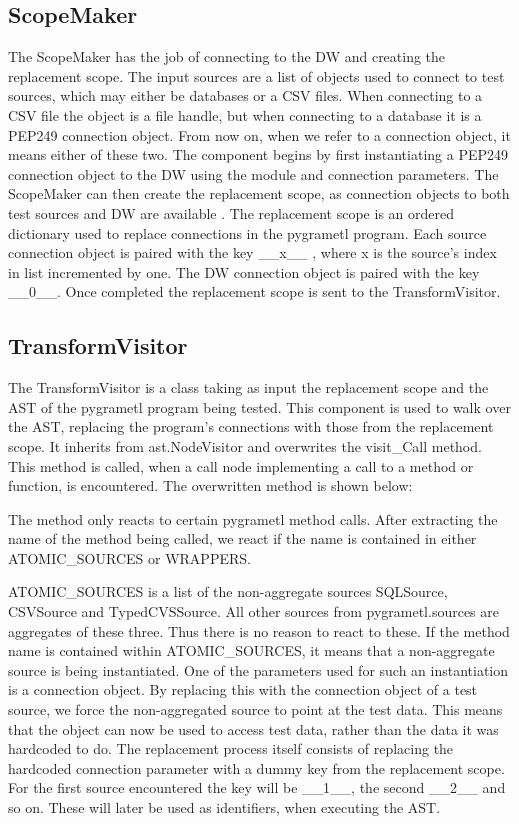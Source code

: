 \subsection{ScopeMaker}
The ScopeMaker has the job of connecting to the DW and creating the replacement scope. The input sources are a list of objects used to connect to test sources, which may either be databases or a CSV files. When connecting to a CSV file the object is a file handle, but when connecting to a database it is a PEP249 connection object. From now on, when we refer to a connection object, it means either of these two. The component begins by first instantiating a PEP249 connection object to the DW using the module and connection parameters. The ScopeMaker can then create the replacement scope, as connection objects to both test sources and DW are available . The replacement scope is an ordered dictionary used to replace connections in the pygrametl program. Each source connection object is paired with the key \_\_x\_\_ , where x is the source's index in list incremented by one. The DW connection object is paired with the key \_\_0\_\_. Once completed the replacement scope is sent to the TransformVisitor.

\subsection{TransformVisitor}
The TransformVisitor is a class taking as input the replacement scope and the AST of the pygrametl program being tested. This component is used to walk over the AST, replacing the program's connections with those from the replacement scope. It inherits from ast.NodeVisitor and overwrites the visit\_Call method. This method is called, when a call node implementing a call to a method or function, is encountered. The overwritten method is shown below:



The method only reacts to certain pygrametl method calls. After extracting the name of the method being called, we react if the name is contained in either ATOMIC\_SOURCES or WRAPPERS.

ATOMIC\_SOURCES is a list of the non-aggregate sources SQLSource, CSVSource and TypedCVSSource. All other sources from pygrametl.sources are aggregates of these three. Thus there is no reason to react to these. If the method name is contained within ATOMIC\_SOURCES, it means that a non-aggregate source is being instantiated. One of the parameters used for such an instantiation is a connection object. By replacing this with the connection object of a test source, we force the non-aggregated source to point at the test data. This means that the object can now be used to access test data, rather than the data it was hardcoded to do. The replacement process itself consists of replacing the hardcoded connection parameter with a dummy key from the replacement scope. For the first source encountered the key will be \_\_1\_\_, the second \_\_2\_\_ and so on. These will later be used as identifiers, when executing the AST.

